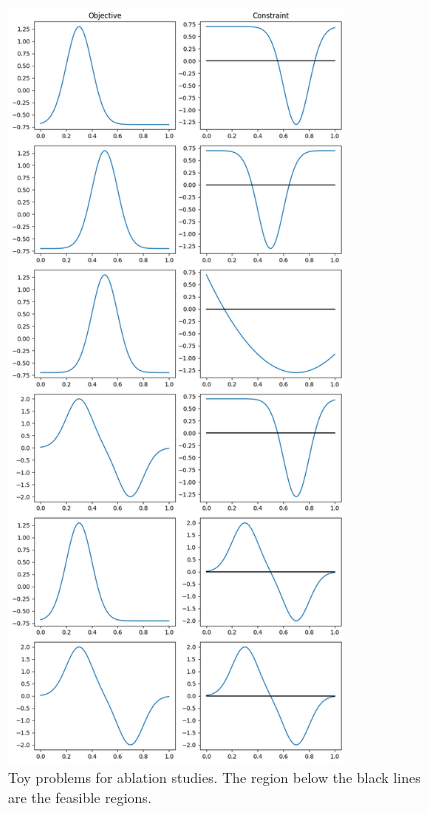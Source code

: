 \begin{figure}[h]
    \centering
    \includegraphics[width=\linewidth, height=20cm]{Figures/toy.png}
    \caption{Toy problems for ablation studies. The region below the black lines are the feasible regions.}
    \label{fig_toy}
\end{figure}


